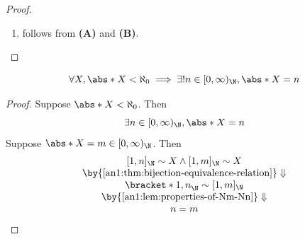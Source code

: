 \begin{proof}
\begin{enumerate}[label=\textbf{(\Alph*)}]
\begin{itemize}
\[\begin{dcases}
                    \end{dcases}
                  \]
                  By \cref{an1:thm:properties-of-composition-functions,an1:thm:properties-of-restriction-functions},
                  \[
                    \begin{array}{c}
                      \paren*{g_{m + 1} \circ f_{m + 1}}|_{[1, n - 1]_{\N} \setminus K_{m + 1}}^{[1, m]_{\N}}:
                      [1, n - 1]_{\N} \setminus K_{m + 1} \twoheadrightarrow [1, m]_{\N} \\
                      \Downarrow                                                         \\
                      f_{m}: [1, n - 1]_{\N} \twoheadrightarrow [1, m]_{\N}              \\
                      \by{\ensuremath{Q(m)}} \Downarrow                                  \\
                      n - 1 \geq m                                                       \\
                      \Downarrow                                                         \\
                      n \geq m + 1 \geq 1                                                \\
                    \end{array}
                  \]
                  Therefore, $Q(m + 1)$.
          \end{itemize}
          By \cref{an1:thm:mathematical-induction},
          \[
            \forall m \in [0, \infty)_{\N}, Q(m)
          \]
    \item follows from \textbf{(A)} and \textbf{(B)}.
  \end{enumerate}
\end{proof}

\begin{corollary} \label{an1:cor:cardinality-is-unique}
  \[
    \forall X, \abs*{X} < \aleph_{0} \implies \exists! n \in [0, \infty)_{\N}, \abs*{X} = n
  \]
\end{corollary}

\begin{proof}
  Suppose $\abs*{X} < \aleph_{0}$. Then
  \[
    \exists n \in [0, \infty)_{\N}, \abs*{X} = n
  \]
  Suppose $\abs*{X} = m \in [0, \infty)_{\N}$. Then
  \[
    \begin{array}{c}
      [1, n]_{\N} \sim X \land [1, m]_{\N} \sim X                   \\
      \by{\Cref{an1:thm:bijection-equivalence-relation}} \Downarrow \\
      \bracket*{1, n}_{\N} \sim [1, m]_{\N}                         \\
      \by{\Cref{an1:lem:properties-of-Nm-Nn}} \Downarrow            \\
      n = m
    \end{array}
  \]
\end{proof}
